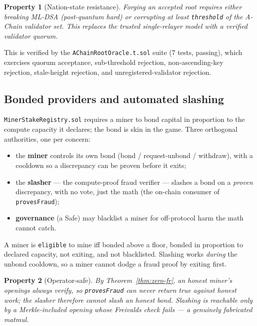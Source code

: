 \documentclass[11pt,a4paper]{article}
\newtheorem{property}{Property}
\begin{document}
\begin{property}[Nation-state resistance]\label{prop:nation-state}
Forging an accepted root requires \emph{either} breaking ML-DSA (post-quantum hard) \emph{or} corrupting at least \texttt{threshold} of the A-Chain validator set. This replaces the trusted single-relayer model with a verified validator quorum.
\end{property}

This is verified by the \texttt{AChainRootOracle.t.sol} suite (7 tests, passing), which exercises quorum acceptance, sub-threshold rejection, non-ascending-key rejection, stale-height rejection, and unregistered-validator rejection.

\subsection{Bonded providers and automated slashing}\label{sec:stake}

\texttt{MinerStakeRegistry.sol} requires a miner to bond capital in proportion to the compute capacity it declares; the bond is skin in the game. Three orthogonal authorities, one per concern:
\begin{itemize}
  \item the \textbf{miner} controls its own bond (bond / request-unbond / withdraw), with a cooldown so a discrepancy can be proven before it exits;
  \item the \textbf{slasher} --- the compute-proof fraud verifier --- slashes a bond on a \emph{proven} discrepancy, with no vote, just the math (the on-chain consumer of \texttt{provesFraud});
  \item \textbf{governance} (a Safe) may blacklist a miner for off-protocol harm the math cannot catch.
\end{itemize}
A miner is \texttt{eligible} to mine iff bonded above a floor, bonded in proportion to declared capacity, not exiting, and not blacklisted. Slashing works \emph{during} the unbond cooldown, so a miner cannot dodge a fraud proof by exiting first.

\begin{property}[Operator-safe]\label{prop:operator-safe}
By Theorem~\ref{thm:zero-fr}, an honest miner's openings always verify, so \texttt{provesFraud} can never return true against honest work; the slasher therefore cannot slash an honest bond. Slashing is reachable only by a Merkle-included opening whose Freivalds check fails --- a genuinely fabricated matmul.
\end{property}
\end{document}
